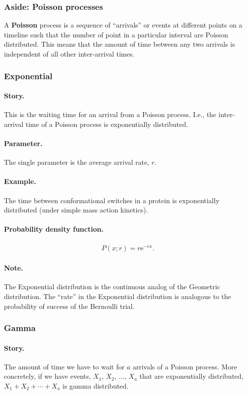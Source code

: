 \subsubsection{Aside: Poisson processes}
A \textbf{Poisson} process is a sequence of ``arrivals'' or events at
different points on a timeline such that the number of point in a
particular interval are Poisson distributed.  This means that the
amount of time between any two arrivals is independent of all other
inter-arrival times.


\subsubsection{Exponential}
\paragraph{Story.} This is the waiting time for an arrival from a
Poisson process.  I.e., the inter-arrival time of a Poisson process is
exponentially distributed.
\paragraph{Parameter.} The single parameter is the average arrival
rate, $r$.
\paragraph{Example.} The time between conformational switches in a
protein is exponentially distributed (under simple mass action
kinetics).
\paragraph{Probability density function.}
\begin{align}
P(x;r) = r \mathrm{e}^{-rx}.
\end{align}
\paragraph{Note.} The Exponential distribution is the continuous
analog of the Geometric distribution.  The ``rate'' in the Exponential
distribution is analogous to the probability of success of the
Bernoulli trial.


\subsubsection{Gamma}
\paragraph{Story.} The amount of time we have to wait for $a$ arrivals
of a Poisson process.  More concretely, if we have events, $X_1$,
$X_2$, $\ldots$, $X_a$ that are exponentially distributed,
$X_1 + X_2 + \cdots + X_a$ is gamma distributed.
